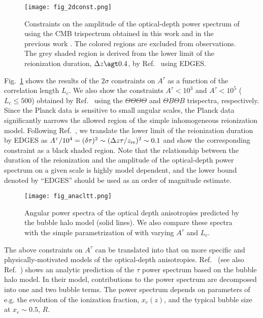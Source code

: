 \documentclass[aps,prd,twocolumn,superscriptaddress,groupedaddress,nofootinbib]{revtex4}
\def\T{\Theta}
\begin{document}
\begin{figure}[t]
\bc
\texttt{[image: fig\_2dconst.png]} 
\caption{
Constraints on the amplitude of the optical-depth power spectrum of  using 
the CMB trispectrum obtained in this work and in the previous work \cite{Gluscevic:2012qv}. 
The colored regions are excluded from observations.
The grey shaded region is derived from the lower limit of the reionization duration, 
$\Delta z\agt0.4$, by Ref.~\cite{Monsalve:2017mli} using EDGES. 
}
\label{fig:2dconst}
\ec
\end{figure}

Fig.~\ref{fig:2dconst} shows the results of the $2\sigma$ constraints on $A^\tau$ as a function of 
the correlation length $L_c$. 
We also show the constraints $A^\tau<10^3$ and $A^\tau<10^5$ ($L_c\leq 500$) obtained by 
Ref.~\cite{Gluscevic:2012qv} using the $\T\T\T\T$ and $\T B\T B$ trispectra, respectively.
Since the Planck data is sensitive to small angular scales, the Planck data significantly 
narrows the allowed region of the simple inhomogeneous reionization model. 
Following Ref.~\cite{Gluscevic:2012qv}, we translate the lower limit of the reionization duration 
by EDGES as $A^\tau/10^4=(\delta\tau)^2\sim (\Delta z\tau/z_{\rm re})^2\sim 0.1$ 
and show the corresponding constraint as a black shaded region. 
Note that the relationship between the duration of the reionization and the amplitude of 
the optical-depth power spectrum on a given scale is highly model dependent, and the lower bound 
denoted by ``EDGES'' should be used as an order of magnitude estimate. 

\begin{figure}[t]
\bc
\texttt{[image: fig\_anacltt.png]} 
\caption{
Angular power spectra of the optical depth anisotropies predicted by the bubble halo model (solid lines). 
We also compare these spectra with the simple parametrization of  with varying $A^\tau$ and $L_c$. 
}
\label{fig:anacltt}
\ec
\end{figure}

The above constraints on $A^\tau$ can be translated into 
that on more specific and physically-motivated models of the optical-depth anisotropies. 
Ref.~\cite{Wang:2006} (see also Ref.~\cite{Dvorkin:2008tf}) shows an analytic prediction of the $\tau$ power spectrum
based on the bubble halo model.
In their model, contributions to the power spectrum are decomposed into one and two bubble terms. 
The power spectrum depends on parameters of e.g. 
the evolution of the ionization fraction, $x_e(z)$, and 
the typical bubble size at $x_e\sim0.5$, $R$. 
\end{document}
